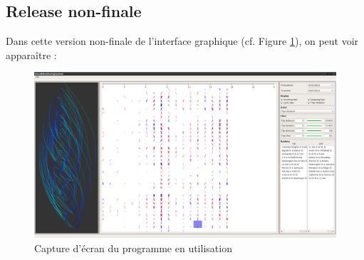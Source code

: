 \documentclass[12pt]{article}
\begin{document}
		
		\subsection{Release non-finale}
		
		Dans cette version non-finale de l’interface graphique (cf. Figure \ref{fig:screen_final_1}), on peut voir apparaître : \\
		
		\begin{figure}[!h]
		\begin{center}
		\includegraphics[scale=.25]{screen_final_1.png}
		\caption{Capture d’écran du programme en utilisation}
		\label{fig:screen_final_1}
		\end{center}
		\end{figure}
		
\end{document}
